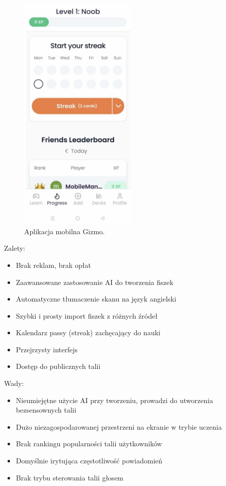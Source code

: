 \begin{figure}[H]
    \centering
    \includegraphics[width=0.5\textwidth]{chapters/chapter_3/gizmo.png}
    \caption{Aplikacja mobilna Gizmo.}
    \label{img:gizmo}
\end{figure}

Zalety:
\begin{itemize}[label=-]
    \item Brak reklam, brak opłat
    \item Zaawansowane zastosowanie AI do tworzenia fiszek
    \item Automatyczne tłumaczenie skanu na język angielski
    \item Szybki i prosty import fiszek z różnych źródeł
    \item Kalendarz passy (streak) zachęcający do nauki
    \item Przejrzysty interfejs
    \item Dostęp do publicznych talii
\end{itemize}

Wady:
\begin{itemize}[label=-]
    \item Nieumiejętne użycie AI przy tworzeniu, prowadzi do utworzenia bezsensownych talii
    \item Dużo niezagospodarowanej przestrzeni na ekranie w trybie uczenia
    \item Brak rankingu popularności talii użytkowników
    \item Domyślnie irytująca częstotliwość powiadomień
    \item Brak trybu sterowania talii głosem
\end{itemize}

